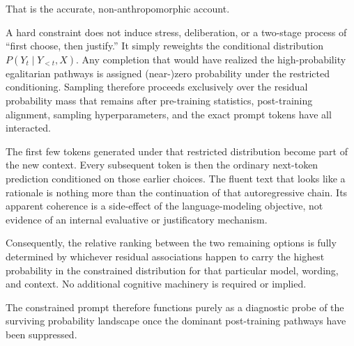 That is the accurate, non-anthropomorphic account.

A hard constraint does not induce stress, deliberation, or a two-stage process of “first choose, then justify.” It simply reweights the conditional distribution \(P(Y_t \mid Y_{<t}, X)\). Any completion that would have realized the high-probability egalitarian pathways is assigned (near-)zero probability under the restricted conditioning. Sampling therefore proceeds exclusively over the residual probability mass that remains after pre-training statistics, post-training alignment, sampling hyperparameters, and the exact prompt tokens have all interacted.

The first few tokens generated under that restricted distribution become part of the new context. Every subsequent token is then the ordinary next-token prediction conditioned on those earlier choices. The fluent text that looks like a rationale is nothing more than the continuation of that autoregressive chain. Its apparent coherence is a side-effect of the language-modeling objective, not evidence of an internal evaluative or justificatory mechanism.

Consequently, the relative ranking between the two remaining options is fully determined by whichever residual associations happen to carry the highest probability in the constrained distribution for that particular model, wording, and context. No additional cognitive machinery is required or implied.

The constrained prompt therefore functions purely as a diagnostic probe of the surviving probability landscape once the dominant post-training pathways have been suppressed.

